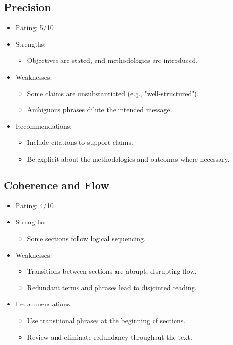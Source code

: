 \documentclass[11pt]{article}
\begin{document}
\subsection{Precision}
\begin{itemize}
    \item Rating: 5/10
    \item Strengths:
        \begin{itemize}
            \item Objectives are stated, and methodologies are introduced.
        \end{itemize}
    \item Weaknesses:
        \begin{itemize}
            \item Some claims are unsubstantiated (e.g., "well-structured").
            \item Ambiguous phrases dilute the intended message.
        \end{itemize}
    \item Recommendations:
        \begin{itemize}
            \item Include citations to support claims.
            \item Be explicit about the methodologies and outcomes where necessary.
        \end{itemize}
\end{itemize}

\subsection{Coherence and Flow}
\begin{itemize}
    \item Rating: 4/10
    \item Strengths:
        \begin{itemize}
            \item Some sections follow logical sequencing.
        \end{itemize}
    \item Weaknesses:
        \begin{itemize}
            \item Transitions between sections are abrupt, disrupting flow.
            \item Redundant terms and phrases lead to disjointed reading.
        \end{itemize}
    \item Recommendations:
        \begin{itemize}
            \item Use transitional phrases at the beginning of sections.
            \item Review and eliminate redundancy throughout the text.
        \end{itemize}
\end{itemize}
\end{document}
